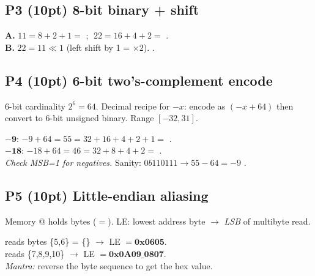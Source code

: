 \subsection{P3 (10pt) 8-bit binary + shift}
\begin{qp}
\textbf{A.} $11 = 8+2+1 = $ ; $\;22 = 16+4+2 = $ .\\
\textbf{B.} $22 = 11 \!\ll\! 1$ (left shift by 1 = $\times 2$). . \checkmark
\end{qp}

\subsection{P4 (10pt) 6-bit two's-complement encode}
6-bit cardinality $2^6 = 64$. Decimal recipe for $-x$: encode as $(-x + 64)$ then convert to 6-bit unsigned binary. Range $[-32,31]$.
\begin{qp}
$\mathbf{-9}$: $-9 + 64 = 55 = 32+16+4+2+1 = $ .\\
$\mathbf{-18}$: $-18 + 64 = 46 = 32+8+4+2 = $ .\\
\emph{Check MSB=1 for negatives.} Sanity: $0b110111 \to 55-64 = -9$ \checkmark.
\end{qp}

\subsection{P5 (10pt) Little-endian aliasing}
Memory @  holds bytes  ($= $). LE: lowest address byte $\to$ \emph{LSB} of multibyte read.
\begin{qp}
 reads bytes \{5,6\} = \{\} $\to$ LE $= \mathbf{0x0605}$.\\
 reads \{7,8,9,10\} $\to$ LE $= \mathbf{0x0A09\_0807}$.\\
\emph{Mantra:} reverse the byte sequence to get the hex value.
\end{qp}

